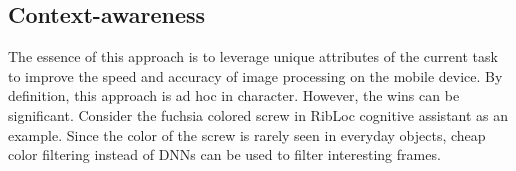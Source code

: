 \subsection{Context-awareness}

The essence of this approach is to leverage unique attributes of the current
task to improve the speed and accuracy of image processing on the mobile device.
By definition, this approach is ad hoc in character. However, the wins can be
significant. Consider the fuchsia colored screw in RibLoc cognitive assistant as
an example. Since the color of the screw is rarely seen in everyday objects,
cheap color filtering instead of DNNs can be used to filter interesting frames.





